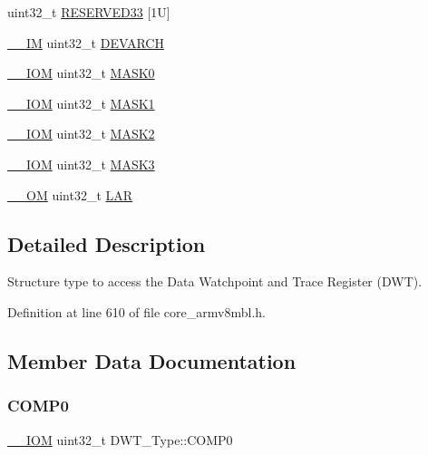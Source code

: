 \begin{DoxyCompactItemize}
uint32\+\_\+t \hyperlink{struct_d_w_t___type_a23488c27be43c80c8c1dfd17aac9c28d}{R\+E\+S\+E\+R\+V\+E\+D33} \mbox{[}1\+U\mbox{]}
\item 
\hyperlink{core__sc300_8h_a4cc1649793116d7c2d8afce7a4ffce43}{\+\_\+\+\_\+\+IM} uint32\+\_\+t \hyperlink{struct_d_w_t___type_ae60dbff3143d15cd04ac984084d8fbc7}{D\+E\+V\+A\+R\+CH}
\item 
\hyperlink{core__sc300_8h_ab6caba5853a60a17e8e04499b52bf691}{\+\_\+\+\_\+\+I\+OM} uint32\+\_\+t \hyperlink{struct_d_w_t___type_a821eb5e71f340ec077efc064cfc567db}{M\+A\+S\+K0}
\item 
\hyperlink{core__sc300_8h_ab6caba5853a60a17e8e04499b52bf691}{\+\_\+\+\_\+\+I\+OM} uint32\+\_\+t \hyperlink{struct_d_w_t___type_aabf94936c9340e62fed836dcfb152405}{M\+A\+S\+K1}
\item 
\hyperlink{core__sc300_8h_ab6caba5853a60a17e8e04499b52bf691}{\+\_\+\+\_\+\+I\+OM} uint32\+\_\+t \hyperlink{struct_d_w_t___type_a00ac4d830dfe0070a656cda9baed170f}{M\+A\+S\+K2}
\item 
\hyperlink{core__sc300_8h_ab6caba5853a60a17e8e04499b52bf691}{\+\_\+\+\_\+\+I\+OM} uint32\+\_\+t \hyperlink{struct_d_w_t___type_a2a509d8505c37a3b64f6b24993df5f3f}{M\+A\+S\+K3}
\item 
\hyperlink{core__sc300_8h_a0ea2009ed8fd9ef35b48708280fdb758}{\+\_\+\+\_\+\+OM} uint32\+\_\+t \hyperlink{struct_d_w_t___type_a4b8037802a3b25e367f0977d86f754ad}{L\+AR}
\end{DoxyCompactItemize}


\subsection{Detailed Description}
Structure type to access the Data Watchpoint and Trace Register (D\+WT). 

Definition at line 610 of file core\+\_\+armv8mbl.\+h.



\subsection{Member Data Documentation}
\mbox{\label{struct_d_w_t___type_a61c2965af5bc0643f9af65620b0e67c9}} 
\subsubsection{\texorpdfstring{C\+O\+M\+P0}{COMP0}}
{\footnotesize\ttfamily \hyperlink{core__sc300_8h_ab6caba5853a60a17e8e04499b52bf691}{\+\_\+\+\_\+\+I\+OM} uint32\+\_\+t D\+W\+T\+\_\+\+Type\+::\+C\+O\+M\+P0}

